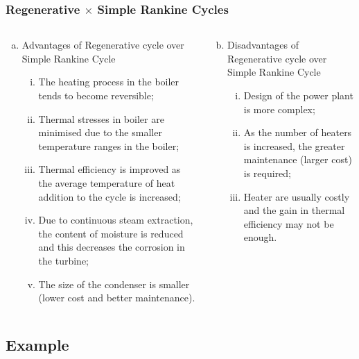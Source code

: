 \documentclass[10pt,compress]{beamer}
\begin{document}
\begin{frame}
 \frametitle{Regenerative $\times$ Simple Rankine Cycles}
  \begin{columns}
   \begin{column}[c]{0.5\linewidth}
    \begin{enumerate}[(a)]
     \item<1-> Advantages of Regenerative cycle over Simple Rankine Cycle
     \begin{enumerate} [(i)]%
      \item<1-> The heating process in the boiler tends to become reversible;
      \item<1-> Thermal stresses in boiler are minimised due to the smaller temperature ranges in the boiler;
      \item<1-> Thermal efficiency is improved as the average temperature of heat addition to the cycle is increased;
      \item<1-> Due to continuous steam extraction, the content of moisture is reduced and this decreases the corrosion in the turbine;
      \item<1-> The size of the condenser is smaller (lower cost and better maintenance).
     \end{enumerate}
    \end{enumerate} 
   \end{column}
%
   \begin{column}[c]{0.5\linewidth}  
    \begin{enumerate}[(a)]\setcounter{enumi}{1}
     \item<2-> Disadvantages of Regenerative cycle over Simple Rankine Cycle
     \begin{enumerate}[(i)] %
      \item<2-> Design of the power plant is more complex;
      \item<2-> As the number of heaters is increased, the greater maintenance (larger cost) is required;
      \item<2-> Heater are usually costly and the gain in thermal efficiency may not be enough. 
     \end{enumerate}
    \end{enumerate} 
   \end{column}
  \end{columns}
  
\end{frame}

\subsection{Example}
\end{document}
